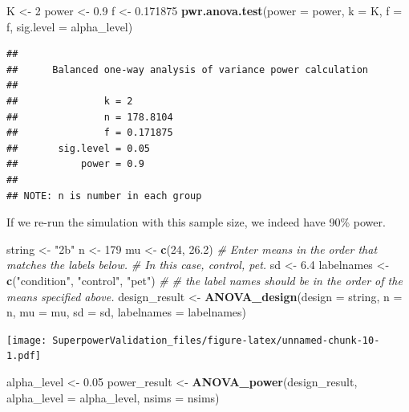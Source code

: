 \documentclass[]{book}
\newenvironment{Shaded}{\begin{snugshade}}{\end{snugshade}}
\newcommand{\CommentTok}[1]{\textcolor[rgb]{0.56,0.35,0.01}{\textit{#1}}}
\newcommand{\DataTypeTok}[1]{\textcolor[rgb]{0.13,0.29,0.53}{#1}}
\newcommand{\DecValTok}[1]{\textcolor[rgb]{0.00,0.00,0.81}{#1}}
\newcommand{\FloatTok}[1]{\textcolor[rgb]{0.00,0.00,0.81}{#1}}
\newcommand{\KeywordTok}[1]{\textcolor[rgb]{0.13,0.29,0.53}{\textbf{#1}}}
\newcommand{\NormalTok}[1]{#1}
\newcommand{\StringTok}[1]{\textcolor[rgb]{0.31,0.60,0.02}{#1}}
\begin{document}
\begin{Shaded}
\begin{Highlighting}[]
\NormalTok{K <-}\StringTok{ }\DecValTok{2}
\NormalTok{power <-}\StringTok{ }\FloatTok{0.9}
\NormalTok{f <-}\StringTok{ }\FloatTok{0.171875}
\KeywordTok{pwr.anova.test}\NormalTok{(}\DataTypeTok{power =}\NormalTok{ power,}
               \DataTypeTok{k =}\NormalTok{ K,}
               \DataTypeTok{f =}\NormalTok{ f,}
               \DataTypeTok{sig.level =}\NormalTok{ alpha_level)}
\end{Highlighting}
\end{Shaded}

\begin{verbatim}
## 
##      Balanced one-way analysis of variance power calculation 
## 
##               k = 2
##               n = 178.8104
##               f = 0.171875
##       sig.level = 0.05
##           power = 0.9
## 
## NOTE: n is number in each group
\end{verbatim}

If we re-run the simulation with this sample size, we indeed have 90\% power.

\begin{Shaded}
\begin{Highlighting}[]
\NormalTok{string <-}\StringTok{ "2b"}
\NormalTok{n <-}\StringTok{ }\DecValTok{179}
\NormalTok{mu <-}\StringTok{ }\KeywordTok{c}\NormalTok{(}\DecValTok{24}\NormalTok{, }\FloatTok{26.2}\NormalTok{)}
\CommentTok{# Enter means in the order that matches the labels below.}
\CommentTok{# In this case, control, pet. }
\NormalTok{sd <-}\StringTok{ }\FloatTok{6.4}
\NormalTok{labelnames <-}\StringTok{ }\KeywordTok{c}\NormalTok{(}\StringTok{"condition"}\NormalTok{, }\StringTok{"control"}\NormalTok{, }\StringTok{"pet"}\NormalTok{) }\CommentTok{#}
\CommentTok{# the label names should be in the order of the means specified above.}
\NormalTok{design_result <-}\StringTok{ }\KeywordTok{ANOVA_design}\NormalTok{(}\DataTypeTok{design =}\NormalTok{ string,}
                   \DataTypeTok{n =}\NormalTok{ n, }
                   \DataTypeTok{mu =}\NormalTok{ mu, }
                   \DataTypeTok{sd =}\NormalTok{ sd, }
                   \DataTypeTok{labelnames =}\NormalTok{ labelnames)}
\end{Highlighting}
\end{Shaded}

\texttt{[image: SuperpowerValidation\_files/figure-latex/unnamed-chunk-10-1.pdf]}

\begin{Shaded}
\begin{Highlighting}[]
\NormalTok{alpha_level <-}\StringTok{ }\FloatTok{0.05}
\NormalTok{power_result <-}\StringTok{ }\KeywordTok{ANOVA_power}\NormalTok{(design_result, }\DataTypeTok{alpha_level =}\NormalTok{ alpha_level, }\DataTypeTok{nsims =}\NormalTok{ nsims)}
\end{Highlighting}
\end{Shaded}
\end{document}

